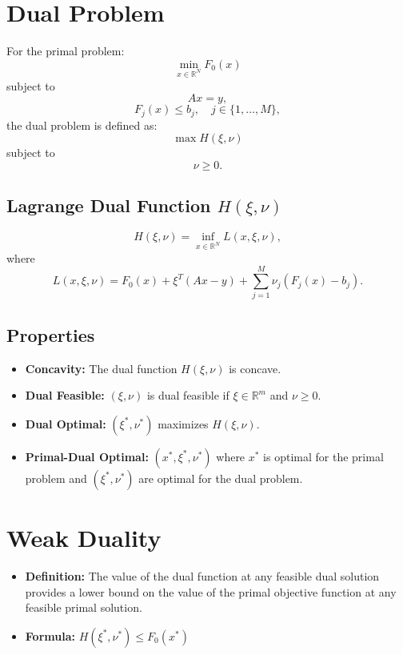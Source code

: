 \documentclass{article}
\begin{document}
\section*{Dual Problem}

For the primal problem:
\[
\min_{x \in \mathbb{R}^N} F_0(x)
\]
subject to
\[
Ax = y,
\]
\[
F_j(x) \leq b_j, \quad j \in \{1, \ldots, M\},
\]
the dual problem is defined as:
\[
\max H(\xi, \nu)
\]
subject to
\[
\nu \geq 0.
\]

\subsection*{Lagrange Dual Function $H(\xi, \nu)$}
\[
H(\xi, \nu) = \inf_{x \in \mathbb{R}^N} L(x, \xi, \nu),
\]
where
\[
L(x, \xi, \nu) = F_0(x) + \xi^T(Ax - y) + \sum_{j=1}^{M} \nu_j (F_j(x) - b_j).
\]

\subsection*{Properties}
\begin{itemize}[leftmargin=*]
    \item \textbf{Concavity:} The dual function $H(\xi, \nu)$ is concave.
    \item \textbf{Dual Feasible:} $(\xi, \nu)$ is dual feasible if $\xi \in \mathbb{R}^m$ and $\nu \geq 0$.
    \item \textbf{Dual Optimal:} $(\xi^*, \nu^*)$ maximizes $H(\xi, \nu)$.
    \item \textbf{Primal-Dual Optimal:} $(x^*, \xi^*, \nu^*)$ where $x^*$ is optimal for the primal problem and $(\xi^*, \nu^*)$ are optimal for the dual problem.
\end{itemize}













\section*{Weak Duality}
\begin{itemize}
    \item \textbf{Definition:} The value of the dual function at any feasible dual solution provides a lower bound on the value of the primal objective function at any feasible primal solution.
    \item \textbf{Formula:} \( H(\xi^{*}, \nu^{*}) \leq F_{0}(x^{*}) \)
\end{itemize}
\end{document}

